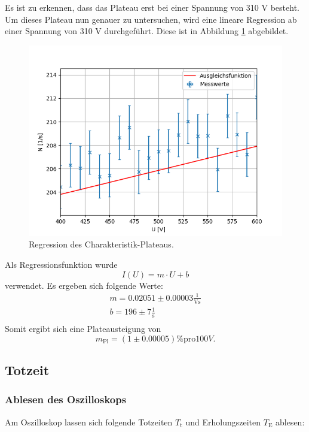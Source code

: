 Es ist zu erkennen, dass das Plateau erst bei einer Spannung von 310 V besteht. Um dieses Plateau nun genauer zu untersuchen, wird eine lineare Regression ab einer Spannung von 310 V durchgeführt. Diese ist in Abbildung \ref{fig:Regression} abgebildet. 

\begin{figure}[H]
    \centering
    \includegraphics[scale=0.7]{Auswertung/Charakteristik_Regression.pdf}
    \caption{Regression des Charakteristik-Plateaus.}
    \label{fig:Regression}
\end{figure}

Als Regressionsfunktion wurde 
\begin{equation*}
	I(U) = m \cdot U + b
\end{equation*}
verwendet.
Es ergeben sich folgende Werte:
\begin{gather*}
	m = 0.02051 \pm 0.00003 \frac{1}{\text{Vs}} \\
	b = 196 \pm 7 \frac{1}{\text{s}}\\
\end{gather*}
Somit ergibt sich eine Plateausteigung von
\begin{equation*}
	m_\text{Pl} = (1 \pm 0.00005)\%  \text{pro}  100V .
\end{equation*}

\subsection{Totzeit}
\subsubsection{Ablesen des Oszilloskops}
Am Oszilloskop lassen sich folgende Totzeiten $T_\text{t}$ und Erholungszeiten $T_\text{E}$ ablesen:
  
